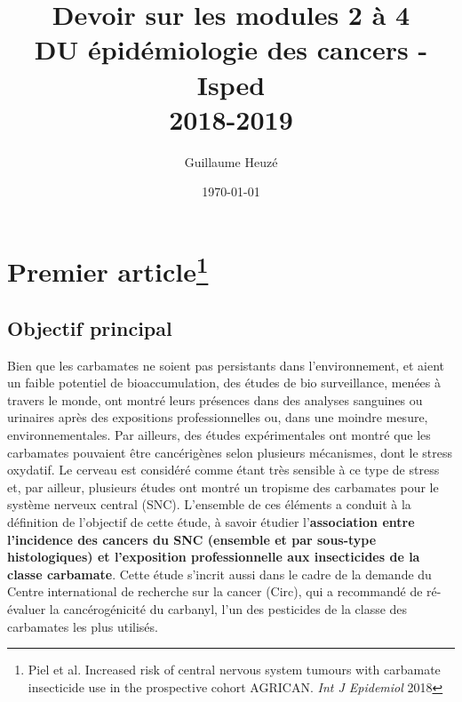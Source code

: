 \documentclass[10pt]{article}
\begin{document}
\title{Devoir sur les modules 2 à 4\\
\small{DU épidémiologie des cancers - Isped\\
2018-2019}}
\author{Guillaume Heuzé}
\date{\today}
\maketitle

\section{Premier article\protect\footnote{Piel et al. Increased risk of central nervous system tumours with carbamate insecticide use in the prospective cohort AGRICAN. \emph{Int J Epidemiol} 2018}}

\subsection{Objectif principal}
Bien que les carbamates ne soient pas persistants dans l'environnement, et aient un faible potentiel de bioaccumulation, des études de bio surveillance, menées à travers le monde, ont montré leurs présences dans des analyses sanguines ou urinaires après des expositions professionnelles ou, dans une moindre mesure, environnementales. Par ailleurs, des études expérimentales ont montré que les carbamates pouvaient être cancérigènes selon plusieurs mécanismes, dont le stress oxydatif. Le cerveau est considéré comme étant très sensible à ce type de stress et, par ailleur, plusieurs études ont montré un tropisme des carbamates pour le système nerveux central (SNC). L'ensemble de ces éléments a conduit à la définition de l'objectif de cette étude, à savoir étudier l'\textbf{association entre l'incidence des cancers du SNC (ensemble et par sous-type histologiques) et l'exposition professionnelle aux insecticides de la classe carbamate}. Cette étude s'incrit aussi dans le cadre de la demande du Centre international de recherche sur la cancer (Circ), qui a recommandé de ré-évaluer la cancérogénicité du carbanyl, l'un des pesticides de la classe des carbamates les plus utilisés.
\end{document}
